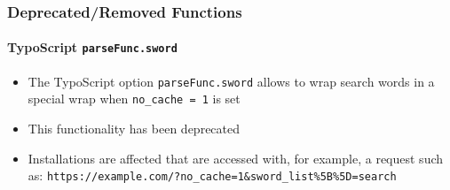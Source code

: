 %

\begin{frame}[fragile]
	\frametitle{Deprecated/Removed Functions}
	\framesubtitle{TypoScript \texttt{parseFunc.sword}}


	\begin{itemize}
		\item The TypoScript option \texttt{parseFunc.sword} allows to wrap search
			words in a special wrap when \texttt{no\_cache = 1} is set
		\item This functionality has been deprecated
		\item Installations are affected that are accessed with, for example,
			a request such as:\newline
			\smaller\texttt{https://example.com/?no\_cache=1\&sword\_list\%5B\%5D=search}\normalsize
	\end{itemize}

\end{frame}

